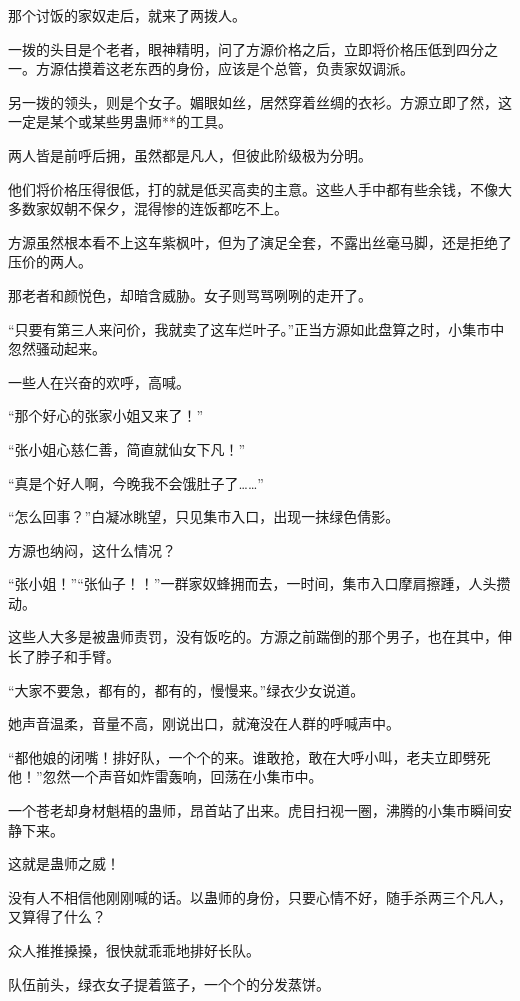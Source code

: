 \begin{this_body}
那个讨饭的家奴走后，就来了两拨人。

一拨的头目是个老者，眼神精明，问了方源价格之后，立即将价格压低到四分之一。方源估摸着这老东西的身份，应该是个总管，负责家奴调派。

另一拨的领头，则是个女子。媚眼如丝，居然穿着丝绸的衣衫。方源立即了然，这一定是某个或某些男蛊师**的工具。

两人皆是前呼后拥，虽然都是凡人，但彼此阶级极为分明。

他们将价格压得很低，打的就是低买高卖的主意。这些人手中都有些余钱，不像大多数家奴朝不保夕，混得惨的连饭都吃不上。

方源虽然根本看不上这车紫枫叶，但为了演足全套，不露出丝毫马脚，还是拒绝了压价的两人。

那老者和颜悦色，却暗含威胁。女子则骂骂咧咧的走开了。

“只要有第三人来问价，我就卖了这车烂叶子。”正当方源如此盘算之时，小集市中忽然骚动起来。

一些人在兴奋的欢呼，高喊。

“那个好心的张家小姐又来了！”

“张小姐心慈仁善，简直就仙女下凡！”

“真是个好人啊，今晚我不会饿肚子了……”

“怎么回事？”白凝冰眺望，只见集市入口，出现一抹绿色倩影。

方源也纳闷，这什么情况？

“张小姐！”“张仙子！！”一群家奴蜂拥而去，一时间，集市入口摩肩擦踵，人头攒动。

这些人大多是被蛊师责罚，没有饭吃的。方源之前踹倒的那个男子，也在其中，伸长了脖子和手臂。

“大家不要急，都有的，都有的，慢慢来。”绿衣少女说道。

她声音温柔，音量不高，刚说出口，就淹没在人群的呼喊声中。

“都他娘的闭嘴！排好队，一个个的来。谁敢抢，敢在大呼小叫，老夫立即劈死他！”忽然一个声音如炸雷轰响，回荡在小集市中。

一个苍老却身材魁梧的蛊师，昂首站了出来。虎目扫视一圈，沸腾的小集市瞬间安静下来。

这就是蛊师之威！

没有人不相信他刚刚喊的话。以蛊师的身份，只要心情不好，随手杀两三个凡人，又算得了什么？

众人推推搡搡，很快就乖乖地排好长队。

队伍前头，绿衣女子提着篮子，一个个的分发蒸饼。


\end{this_body}
